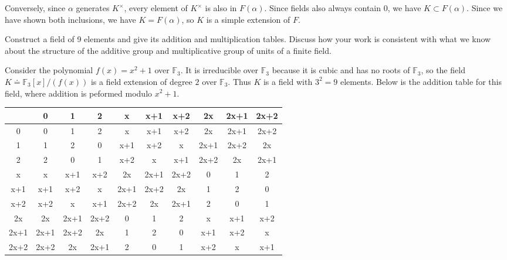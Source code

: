 \documentclass[10pt]{report}
\begin{document}
Conversely, since $\alpha$ generates $K^{\times}$, every element of $K^{\times}$ is also in $F(\alpha)$. Since fields also always contain $0$, we have $K \subset F(\alpha)$. Since we have shown both inclusions, we have $K=F(\alpha)$, so $K$ is a simple extension of $F$.
\newpage

\begin{exer}[]
	Construct a field of 9 elements and give its addition and multiplication tables. Discuss how your work is consistent with what we know about the structure of the additive group and multiplicative group of units of a finite field.
\end{exer}
Consider the polynomial $f(x) = x^2 + 1$ over $\mathbb{F}_{3}$. It is irreducible over $\mathbb{F}_3$ because it is cubic and has no roots of $\mathbb{F}_{3}$, so the field $K \doteq \mathbb{F}_{3}[x] / (f(x))$ is a field extension of degree $2$ over $\mathbb{F}_{3}$. Thus $K$ is a field with $3^2=9$ elements. Below is the addition table for this field, where addition is peformed modulo $x^2+1$.
\begin{center}
	\begin{tabular}{ c||c|c|c|c|c|c|c|c|c }
		  & 0 & 1 & 2 & x & x+1 & x+2 & 2x & 2x+1 & 2x+2 \\
		  \hline \hline
		0 & 0 & 1 & 2 & x & x+1 & x+2 & 2x & 2x+1 & 2x+2 \\
		1 & 1 & 2 & 0 & x+1 & x+2 & x & 2x+1 & 2x+2 & 2x\\
		2 & 2 & 0 & 1 & x+2 & x & x+1 & 2x+2 & 2x & 2x+1 \\
		x & x & x+1 & x+2 & 2x & 2x+1 & 2x+2&0&1&2 \\
		x+1&x+1&x+2&x&2x+1&2x+2&2x&1&2&0 \\
		x+2&x+2&x&x+1&2x+2&2x&2x+1&2&0&1\\
		2x&2x&2x+1&2x+2&0&1&2&x&x+1&x+2\\
		2x+1&2x+1&2x+2&2x&1&2&0&x+1&x+2&x\\
		2x+2&2x+2&2x&2x+1&2&0&1&x+2&x&x+1
	\end{tabular}
\end{center}
\end{document}
